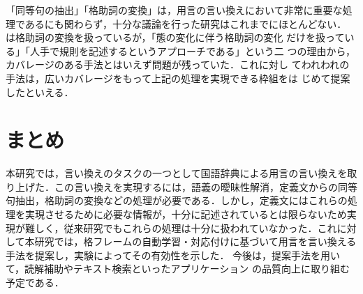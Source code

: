 「同等句の抽出」「格助詞の変換」は，用言の言い換えにおいて非常に重要な処
理であるにも関わらず，十分な議論を行った研究はこれまでにほとんどない．
\cite{Kondo01}は格助詞の変換を扱っているが，「態の変化に伴う格助詞の変化
だけを扱っている」「人手で規則を記述するというアプローチである」という二
つの理由から，カバレージのある手法とはいえず問題が残っていた．これに対し
てわれわれの手法は，広いカバレージをもって上記の処理を実現できる枠組をは
じめて提案したといえる．


\section{まとめ}

本研究では，言い換えのタスクの一つとして国語辞典による用言の言い換えを取
り上げた．この言い換えを実現するには，語義の曖昧性解消，定義文からの同等
句抽出，格助詞の変換などの処理が必要である．しかし，定義文にはこれらの処
理を実現させるために必要な情報が，十分に記述されているとは限らないため実
現が難しく，従来研究でもこれらの処理は十分に扱われていなかった．これに対
して本研究では，格フレームの自動学習・対応付けに基づいて用言を言い換える
手法を提案し，実験によってその有効性を示した．
今後は，提案手法を用いて，読解補助やテキスト検索といったアプリケーション
の品質向上に取り組む予定である．





\begin{biography}


\end{biography}



